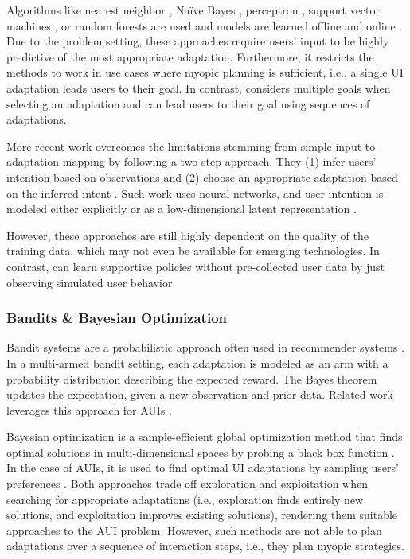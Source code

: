 Algorithms like nearest neighbor \cite{Maes1995, Lashkari1997}, Naïve Bayes \cite{McCreath2006,Faulring2010}, perceptron \cite{Shen2009a, Shen2009b}, support vector machines \cite{Berry2011}, or random forests \cite{Pejovic2014, Mehrotra2015} are used and models are learned offline \cite{Berry2011} and online \cite{Shen2009a}.
Due to the problem setting, these approaches require users' input to be highly predictive of the most appropriate adaptation. Furthermore, it restricts the methods to work in use cases where myopic planning is sufficient, i.e., a single UI adaptation leads users to their goal.
In contrast, \marlui considers multiple goals when selecting an adaptation and can lead users to their goal using sequences of adaptations.

More recent work overcomes the limitations stemming from simple input-to-adaptation mapping by following a two-step approach. They (1) infer users' intention based on observations and (2) choose an appropriate adaptation based on the inferred intent \cite{oulasvirta2018computational}. Such work uses neural networks, and user intention is modeled either explicitly \cite{kolekar2010learning, soh2017deep} or as a low-dimensional latent representation \cite{RIZZOGLIO2021}.

However, these approaches are still highly dependent on the quality of the training data, which may not even be available for emerging technologies. In contrast, \marlui can learn supportive policies without pre-collected user data by just observing simulated user behavior.

\subsubsection{Bandits \& Bayesian Optimization}
Bandit systems are a probabilistic approach often used in recommender systems \cite{glowacka2019bandit}. In a multi-armed bandit setting, each adaptation is modeled as an arm with a probability distribution describing the expected reward. The Bayes theorem updates the expectation, given a new observation and prior data. Related work leverages this approach for AUIs \cite{lomas2016interface,koch2019may,kangas2022scalable}.

Bayesian optimization is a sample-efficient global optimization method that finds optimal solutions in multi-dimensional spaces by probing a black box function \cite{shahriari2015taking}. In the case of AUIs, it is used to find optimal UI adaptations by sampling users' preferences \cite{Koyama2014, Koyama2016}. Both approaches trade off exploration and exploitation when searching for appropriate adaptations (i.e., exploration finds entirely new solutions, and exploitation improves existing solutions), rendering them suitable approaches to the AUI problem. However, such methods are not able to plan adaptations over a sequence of interaction steps, i.e., they plan myopic strategies.


